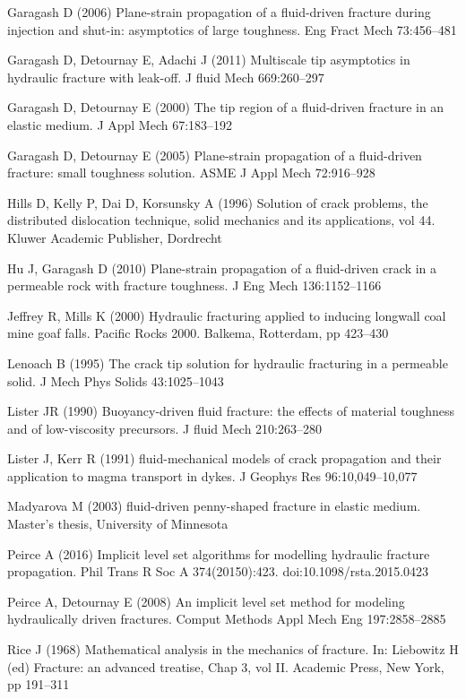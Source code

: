 \documentclass[main.tex]{subfiles}
\begin{document}
Garagash D (2006) Plane-strain propagation of a fluid-driven fracture during injection and shut-in: asymptotics of large toughness. Eng Fract Mech 73:456–481

Garagash D, Detournay E, Adachi J (2011) Multiscale tip asymptotics in hydraulic fracture with leak-off. J fluid Mech 669:260–297

Garagash D, Detournay E (2000) The tip region of a fluid-driven fracture in an elastic medium. J Appl Mech 67:183–192

Garagash D, Detournay E (2005) Plane-strain propagation of a fluid-driven fracture: small toughness solution. ASME J Appl Mech 72:916–928

Hills D, Kelly P, Dai D, Korsunsky A (1996) Solution of crack problems, the distributed dislocation technique, solid mechanics and its applications, vol 44. Kluwer Academic Publisher, Dordrecht

Hu J, Garagash D (2010) Plane-strain propagation of a fluid-driven crack in a permeable rock with fracture toughness. J Eng Mech 136:1152–1166

Jeffrey R, Mills K (2000) Hydraulic fracturing applied to inducing longwall coal mine goaf falls. Pacific Rocks 2000. Balkema, Rotterdam, pp 423–430

Lenoach B (1995) The crack tip solution for hydraulic fracturing in a permeable solid. J Mech Phys Solids 43:1025–1043

Lister JR (1990) Buoyancy-driven fluid fracture: the effects of material toughness and of low-viscosity precursors. J fluid Mech 210:263–280

Lister J, Kerr R (1991) fluid-mechanical models of crack propagation and their application to magma transport in dykes. J Geophys Res 96:10,049–10,077

Madyarova M (2003) fluid-driven penny-shaped fracture in elastic medium. Master’s thesis, University of Minnesota

Peirce A (2016) Implicit level set algorithms for modelling hydraulic fracture propagation. Phil Trans R Soc A 374(20150):423. doi:10.1098/rsta.2015.0423 

Peirce A, Detournay E (2008) An implicit level set method for modeling hydraulically driven fractures. Comput Methods Appl Mech Eng 197:2858–2885

Rice J (1968) Mathematical analysis in the mechanics of fracture. In: Liebowitz H (ed) Fracture: an advanced treatise, Chap 3, vol II. Academic Press, New York, pp 191–311
\end{document}
